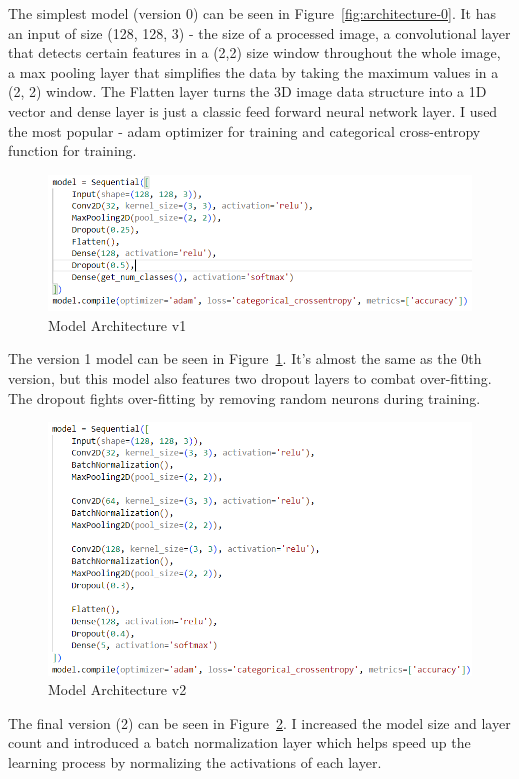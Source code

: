 \documentclass{article}
\begin{document}
The simplest model (version 0) can be seen in Figure~\ref{fig:architecture-0}. It has an input of size (128, 128, 3) - the size of a processed image, a convolutional layer that detects certain features in a (2,2) size window throughout the whole image, a max pooling layer that simplifies the data by taking the maximum values in a (2, 2) window. The Flatten layer turns the 3D image data structure into a 1D vector and dense layer is just a classic feed forward neural network layer. I used the most popular - adam optimizer for training and categorical cross-entropy function for training. 
\begin{figure}[H]
    \centering
    \includegraphics[width=1\textwidth]{architecture-1.png}
    \caption{Model Architecture v1}
    \label{fig:architecture-1}
\end{figure}
The version 1 model can be seen in Figure~\ref{fig:architecture-1}. It's almost the same as the 0th version, but this model also features two dropout layers to combat over-fitting. The dropout fights over-fitting by removing random neurons during training.
\begin{figure}[H]
    \centering
    \includegraphics[width=1\textwidth]{architecture-2.png}
    \caption{Model Architecture v2}
    \label{fig:architecture-2}
\end{figure}
The final version (2) can be seen in Figure~\ref{fig:architecture-2}. I increased the model size and layer count and introduced a batch normalization layer which helps speed up the learning process by normalizing the activations of each layer.
\end{document}

